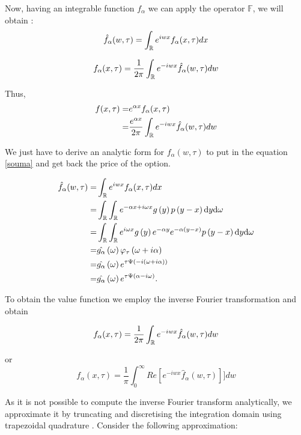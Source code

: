 \documentclass[12pt]{report}
\begin{document}
Now, having an integrable function $f_\alpha$ we can apply the operator $\mathbb{F}$, we will obtain :
\begin{gather}
\hat{f}_{\alpha}(w,\tau)=\int_{\mathbb{R}} e^{iwx} f_{\alpha}(x,\tau) dx 
\end{gather}


\begin{equation}
f_{\alpha}(x,\tau)=\frac{1}{2\pi}\int_{\mathbb{R}} e^{-iwx}\hat{f}_{\alpha}(w,\tau) dw
\end{equation}

Thus,\\
\begin{align}
f(x,\tau)= & e^{\alpha x} f_{\alpha}(x,\tau)\\
= & \frac{e^{\alpha x}}{2\pi}\int_{\mathbb{R}} e^{-iwx}\hat{f}_{\alpha}(w,\tau) dw
\label{souma}
\end{align}

We just have to derive an analytic form for $f_\alpha(w,\tau)$ to put in the equation \eqref{souma} and get back the price of the option.

\begin{align*}
\hat{f}_{\alpha}(w,\tau)= &\int_{\mathbb{R}} e^{iwx} f_{\alpha}(x,\tau) dx
\\
= &  \int_{\mathbb{R}} \int_{\mathbb{R}} e^{- \alpha x + i \omega x} g \left( {y} \right)  p \left( {y-x} \right) \textrm{d} y \textrm{d} \omega
\\
= & \int_{\mathbb{R}} \int_{\mathbb{R}} e^{ i \omega x} g \left( {y} \right) e^{-\alpha y} e^{-\alpha \left( {y
-x} \right)}  p \left( {y-x} \right) \textrm{d} y \textrm{d} \omega
\\
= &\hat {g_{\alpha}} \left( {\omega} \right) \varphi_{\tau} \left( {{\omega + i \alpha}} \right)
\\
= & \hat {g_{\alpha}} \left( {\omega} \right) e^{\tau \Psi \left( {{-i \left( {\omega+i \alpha} \right)}} \right) }
\\
= & \hat {g_{\alpha}} \left( {\omega} \right) e^{\tau \Psi \left( {{\alpha - i \omega}} \right) }.
\end{align*}

To obtain the value function we employ the inverse Fourier transformation and
obtain

\begin{equation}
f_{\alpha}(x,\tau)=\frac{1}{2\pi}\int_{\mathbb{R}} e^{-iwx}\hat{f}_{\alpha}(w,\tau) dw
\end{equation}

or 
\begin{equation}
f_{\alpha}(x,\tau)=\frac{1}{\pi}\int_{0}^{\infty} Re[e^{-iwx}\hat{f}_{\alpha}(w,\tau)] ]dw
\end{equation}


As it is not possible to compute the inverse Fourier transform analytically, we
approximate it by truncating and discretising the integration domain using trapezoidal
quadrature . Consider the following approximation:
\end{document}
